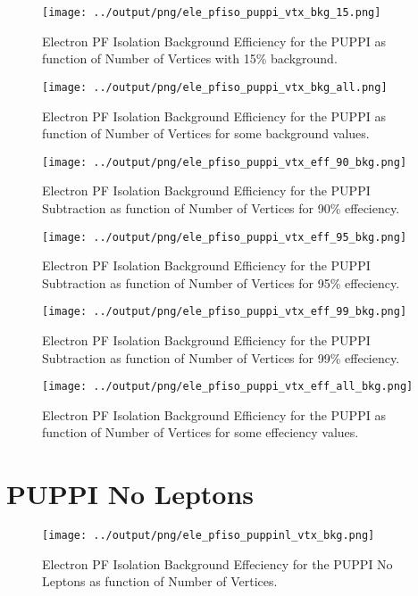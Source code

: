 \documentclass[11pt]{book}
\begin{document}
\begin{figure}[htb]
\centering
\texttt{[image: ../output/png/ele\_pfiso\_puppi\_vtx\_bkg\_15.png]}
\caption{Electron PF Isolation Background Efficiency for the PUPPI as function of Number of Vertices with 15\% background.}
\label{fig:ele_pfiso_vtx_bkg_puppi_bkg_15}
\end{figure}

\begin{figure}[htb]
\centering
\texttt{[image: ../output/png/ele\_pfiso\_puppi\_vtx\_bkg\_all.png]}
\caption{Electron PF Isolation Background Efficiency for the PUPPI as function of Number of Vertices for some background values.}
\label{fig:ele_pfiso_vtx_bkg_puppi_bkg_all}
\end{figure}

\begin{figure}[htb]
\centering
\texttt{[image: ../output/png/ele\_pfiso\_puppi\_vtx\_eff\_90\_bkg.png]}
\caption{Electron PF Isolation Background Efficiency for the PUPPI Subtraction as function of Number of Vertices for 90\% effeciency.}
\label{fig:ele_pfiso_vtx_eff_puppi_eff_90_bkg}
\end{figure}

\begin{figure}[htb]
\centering
\texttt{[image: ../output/png/ele\_pfiso\_puppi\_vtx\_eff\_95\_bkg.png]}
\caption{Electron PF Isolation Background Efficiency for the PUPPI Subtraction as function of Number of Vertices for 95\% effeciency.}
\label{fig:ele_pfiso_vtx_eff_puppi_eff_95_bkg}
\end{figure}

\begin{figure}[htb]
\centering
\texttt{[image: ../output/png/ele\_pfiso\_puppi\_vtx\_eff\_99\_bkg.png]}
\caption{Electron PF Isolation Background Efficiency for the PUPPI Subtraction as function of Number of Vertices for 99\% effeciency.}
\label{fig:ele_pfiso_vtx_eff_puppi_eff_99_bkg}
\end{figure}

\begin{figure}[htb]
\centering
\texttt{[image: ../output/png/ele\_pfiso\_puppi\_vtx\_eff\_all\_bkg.png]}
\caption{Electron PF Isolation Background Efficiency for the PUPPI as function of Number of Vertices for some effeciency values.}
\label{fig:ele_pfiso_vtx_eff_puppi_eff_all_bkg}
\end{figure}
\clearpage

\section{PUPPI No Leptons}
\begin{figure}[htb]
\centering
\texttt{[image: ../output/png/ele\_pfiso\_puppinl\_vtx\_bkg.png]}
\caption{Electron PF Isolation Background Effeciency for the PUPPI No Leptons as function of Number of Vertices.}
\label{fig:ele_pfiso_vtx_bkg_puppinl}
\end{figure}
\end{document}
